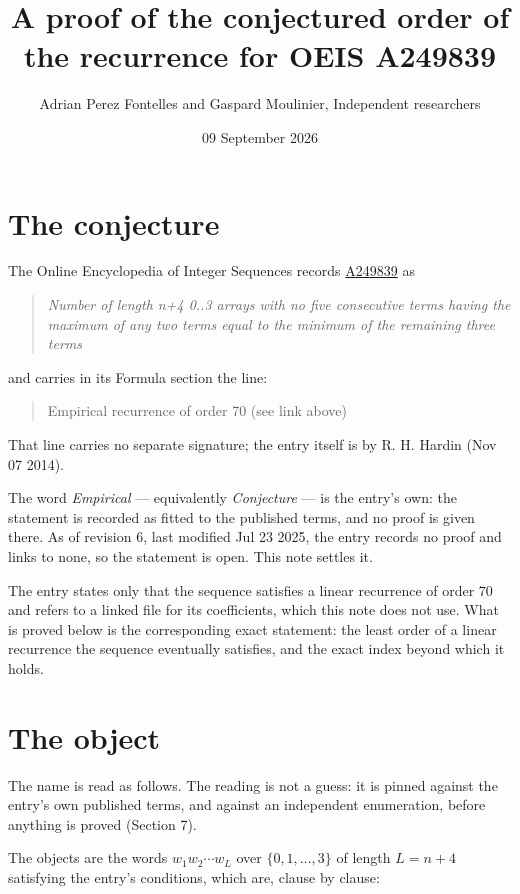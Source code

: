 \documentclass[11pt]{article}
\title{A proof of the conjectured order of the recurrence for OEIS A249839}
\author{Adrian Perez Fontelles and Gaspard Moulinier, Independent researchers}
\date{09 September 2026}
\theoremstyle{definition}
\begin{document}
\maketitle
\section{The conjecture}

The Online Encyclopedia of Integer Sequences records \href{https://oeis.org/A249839}{A249839} as

\begin{quote}\itshape Number of length n+4 0..3 arrays with no five consecutive terms having the maximum of any two terms equal to the minimum of the remaining three terms\end{quote}

and carries in its Formula section the line:

\begin{quote}\ttfamily Empirical recurrence of order 70 (see link above)\end{quote}

That line carries no separate signature; the entry itself is by R. H. Hardin (Nov 07 2014).

The word {\itshape Empirical} --- equivalently {\itshape Conjecture} --- is the entry's own: the statement is recorded as fitted to the published terms, and no proof is given there. As of revision 6, last modified Jul 23 2025, the entry records no proof and links to none, so the statement is open. This note settles it.

The entry states only that the sequence satisfies a linear recurrence of order $70$ and refers to a linked file for its coefficients, which this note does not use. What is proved below is the corresponding exact statement: the least order of a linear recurrence the sequence eventually satisfies, and the exact index beyond which it holds.

\section{The object}

The name is read as follows. The reading is not a guess: it is pinned against the entry's own published terms, and against an independent enumeration, before anything is proved (Section 7).

The objects are the words $w_1 w_2 \cdots w_L$ over $\{0,1,\dots,3\}$ of length $L = n + 4$ satisfying the entry's conditions, which are, clause by clause:
\end{document}
